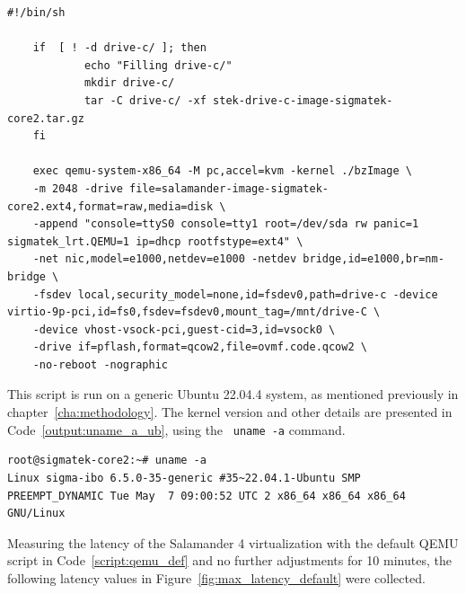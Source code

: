 \documentclass[MMR,Master,english]{twbook}
\begin{document}
\vspace{1em}
\begin{minipage}{\linewidth}
	\begin{lstlisting}[name={QEMU script for starting Salamander 4 virtualization},label={script:qemu_def}]
	#!/bin/sh

	if  [ ! -d drive-c/ ]; then
			echo "Filling drive-c/"
			mkdir drive-c/
			tar -C drive-c/ -xf stek-drive-c-image-sigmatek-core2.tar.gz
	fi
		
	exec qemu-system-x86_64 -M pc,accel=kvm -kernel ./bzImage \
	-m 2048 -drive file=salamander-image-sigmatek-core2.ext4,format=raw,media=disk \
	-append "console=ttyS0 console=tty1 root=/dev/sda rw panic=1 sigmatek_lrt.QEMU=1 ip=dhcp rootfstype=ext4" \
	-net nic,model=e1000,netdev=e1000 -netdev bridge,id=e1000,br=nm-bridge \
	-fsdev local,security_model=none,id=fsdev0,path=drive-c -device virtio-9p-pci,id=fs0,fsdev=fsdev0,mount_tag=/mnt/drive-C \
	-device vhost-vsock-pci,guest-cid=3,id=vsock0 \
	-drive if=pflash,format=qcow2,file=ovmf.code.qcow2 \
	-no-reboot -nographic
\end{lstlisting}
\end{minipage}

\noindent This script is run on a generic Ubuntu 22.04.4 system, as mentioned previously in chapter~\ref{cha:methodology}. The kernel version and other details are presented in Code~\ref{output:uname_a_ub}, using the ~\texttt{uname -a} command.

\vspace{1em}
\begin{minipage}{0.95\columnwidth}
	\begin{lstlisting}[name={Ubuntu 22.04.4 system information},label={output:uname_a_ub}]
root@sigmatek-core2:~# uname -a 
Linux sigma-ibo 6.5.0-35-generic #35~22.04.1-Ubuntu SMP PREEMPT_DYNAMIC Tue May  7 09:00:52 UTC 2 x86_64 x86_64 x86_64 GNU/Linux
\end{lstlisting}
\end{minipage}

\noindent Measuring the latency of the Salamander 4 virtualization with the default QEMU script in Code~\ref{script:qemu_def} and no further adjustments for 10 minutes, the following latency values in Figure~\ref{fig:max_latency_default} were collected. 
\end{document}

